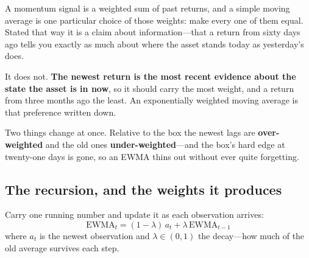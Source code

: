 A momentum signal is a weighted sum of past returns, and a simple moving average is one particular
choice of those weights: make every one of them equal. Stated that way it is a claim about
information---that a return from sixty days ago tells you exactly as much about where the asset
stands today as yesterday's does.

It does not. \textbf{The newest return is the most recent evidence about the state the asset is in
now}, so it should carry the most weight, and a return from three months ago the least. An
exponentially weighted moving average is that preference written down.


Two things change at once. Relative to the box the newest lags are \textbf{over-weighted} and the
old ones \textbf{under-weighted}---and the box's hard edge at twenty-one days is gone, so an EWMA
thins out without ever quite forgetting.

\subsection{The recursion, and the weights it produces}\label{sec:ewma-recursion}

\begin{definition}[EWMA]\label{def:ewma}
Carry one running number and update it as each observation arrives:
\[
  \mathrm{EWMA}_t = (1 - \lambda)\, a_t + \lambda\, \mathrm{EWMA}_{t-1}
\]
where $a_t$ is the newest observation and $\lambda \in (0, 1)$ the decay---how much of the old
average survives each step.
\end{definition}

